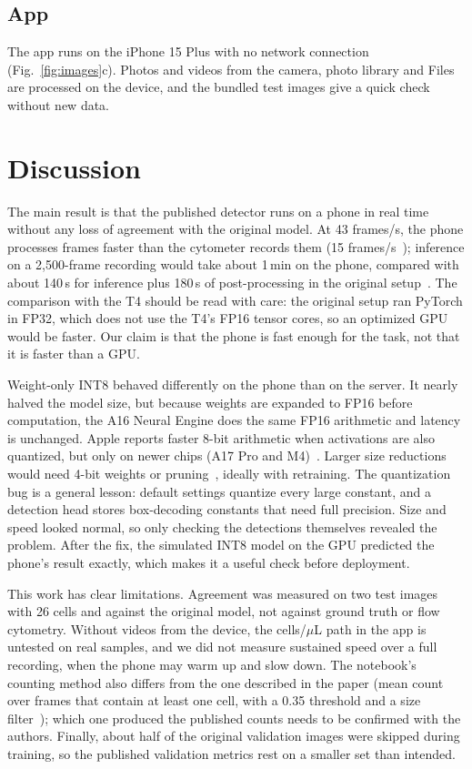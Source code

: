 \documentclass[conference]{IEEEtran}
\begin{document}
\subsection{App}
The app runs on the iPhone 15 Plus with no network connection (Fig.~\ref{fig:images}c). Photos and videos from the camera, photo library and Files are processed on the device, and the bundled test images give a quick check without new data.

\section{Discussion}

The main result is that the published detector runs on a phone in real time without any loss of agreement with the original model. At 43 frames/s, the phone processes frames faster than the cytometer records them (15 frames/s~\cite{dixit2025}); inference on a 2,500-frame recording would take about 1\,min on the phone, compared with about 140\,s for inference plus 180\,s of post-processing in the original setup~\cite{dixit2025}. The comparison with the T4 should be read with care: the original setup ran PyTorch in FP32, which does not use the T4's FP16 tensor cores, so an optimized GPU would be faster. Our claim is that the phone is fast enough for the task, not that it is faster than a GPU.

Weight-only INT8 behaved differently on the phone than on the server. It nearly halved the model size, but because weights are expanded to FP16 before computation, the A16 Neural Engine does the same FP16 arithmetic and latency is unchanged. Apple reports faster 8-bit arithmetic when activations are also quantized, but only on newer chips (A17 Pro and M4)~\cite{coremlperf}. Larger size reductions would need 4-bit weights or pruning~\cite{han2016}, ideally with retraining. The quantization bug is a general lesson: default settings quantize every large constant, and a detection head stores box-decoding constants that need full precision. Size and speed looked normal, so only checking the detections themselves revealed the problem. After the fix, the simulated INT8 model on the GPU predicted the phone's result exactly, which makes it a useful check before deployment.

This work has clear limitations. Agreement was measured on two test images with 26 cells and against the original model, not against ground truth or flow cytometry. Without videos from the device, the cells/$\mu$L path in the app is untested on real samples, and we did not measure sustained speed over a full recording, when the phone may warm up and slow down. The notebook's counting method also differs from the one described in the paper (mean count over frames that contain at least one cell, with a 0.35 threshold and a size filter~\cite{dixit2025}); which one produced the published counts needs to be confirmed with the authors. Finally, about half of the original validation images were skipped during training, so the published validation metrics rest on a smaller set than intended.
\end{document}
